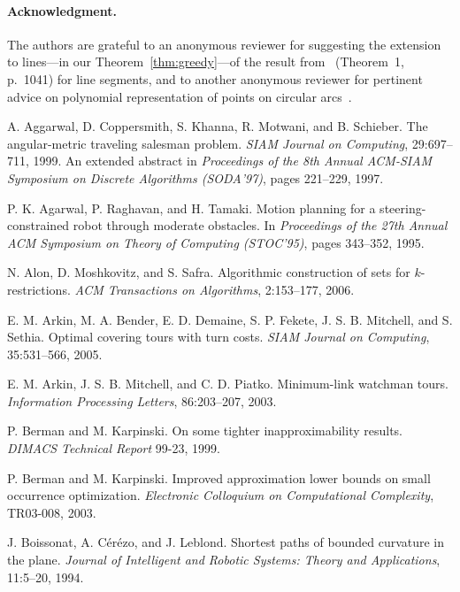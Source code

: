 \documentclass[letterpaper,11pt]{article}
\begin{document}
\paragraph{Acknowledgment.}
The authors are grateful to an anonymous reviewer for suggesting the extension
to lines---in our Theorem~\ref{thm:greedy}---of the result
from~\cite{BLWM12} (Theorem~1, p.~1041) for line segments,
and to another anonymous reviewer for pertinent advice on polynomial
representation of points on circular arcs~\cite{CDR92,Bu98}.



\begin{thebibliography}{99}

A. Aggarwal, D. Coppersmith, S. Khanna, R. Motwani, and B. Schieber.
The angular-metric traveling salesman problem.
\emph{SIAM Journal on Computing},
29:697--711, 1999.
An extended abstract in \emph{Proceedings of the 8th Annual ACM-SIAM
  Symposium on Discrete Algorithms (SODA'97)}, 
pages 221--229, 1997.

P. K. Agarwal, P. Raghavan, and H. Tamaki.
Motion planning for a steering-constrained robot through moderate obstacles.
In \emph{Proceedings of the 27th Annual ACM Symposium on Theory of
  Computing (STOC'95)}, 
pages 343--352, 1995.

N. Alon, D. Moshkovitz, and S. Safra.
Algorithmic construction of sets for $k$-restrictions.
\emph{ACM Transactions on Algorithms},
2:153--177, 2006.

E. M. Arkin, M. A. Bender, E. D. Demaine, S. P. Fekete,
J. S. B. Mitchell, and S. Sethia. 
Optimal covering tours with turn costs.
\emph{SIAM Journal on Computing},
35:531--566, 2005.

E. M. Arkin, J. S. B. Mitchell, and C. D. Piatko.
Minimum-link watchman tours.
\emph{Information Processing Letters},
86:203--207, 2003.

P. Berman and M. Karpinski.
On some tighter inapproximability results.
\emph{DIMACS Technical Report} 99-23, 1999.

P. Berman and M. Karpinski.
Improved approximation lower bounds on small occurrence optimization.
\emph{Electronic Colloquium on Computational Complexity},
TR03-008, 2003.

J. Boissonat, A. C{\'e}r{\'e}zo, and J. Leblond.
Shortest paths of bounded curvature in the plane.
\emph{Journal of Intelligent and Robotic Systems: Theory and Applications},
11:5--20, 1994.


\end{thebibliography}
\end{document}
